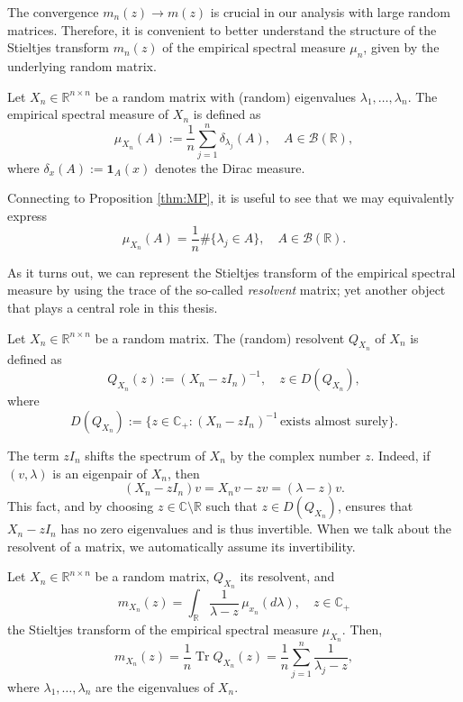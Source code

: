 \documentclass{article}
\begin{document}
\bigskip
\par
The convergence $m_n(z)\to m(z)$ is crucial in our analysis with large random matrices. Therefore, it is convenient to better understand the structure of the Stieltjes transform $m_n(z)$ of the empirical spectral measure $\mu_n$, given by the underlying random matrix.
\bigskip
\\
\begin{definition}
Let $X_n\in\mathbb{R}^{n\times n}$ be a random matrix with (random) eigenvalues $\lambda_1,\dots,\lambda_n$. The empirical spectral measure of $X_n$ is defined as
$$\mu_{X_n}(A):=\frac{1}{n}\sum_{j=1}^n\delta_{\lambda_j}(A),\quad A\in\mathcal{B}(\mathbb{R}),$$
where $\delta_x(A):=\mathbf{1}_A(x)$ denotes the Dirac measure.
\end{definition}
\bigskip
\par
Connecting to Proposition \ref{thm:MP}, it is useful to see that we may equivalently express
\begin{equation}
\mu_{X_n}(A)=\frac{1}{n}\#\{\lambda_j\in A\},\quad A\in\mathcal{B}(\mathbb{R}).
\end{equation}
\smallskip
\par
As it turns out, we can represent the Stieltjes transform of the empirical spectral measure by using the trace of the so-called \emph{resolvent} matrix; yet another object that plays a central role in this thesis.
\bigskip
\\
\begin{definition}[Resolvent]
Let $X_n\in\mathbb{R}^{n\times n}$ be a random matrix. The (random) resolvent $Q_{X_n}$ of $X_n$ is defined as
$$Q_{X_n}(z):=(X_n-zI_n)^{-1},\quad z\in D(Q_{X_n}),$$
where
$$D(Q_{X_n}):=\{z\in\mathbb{C}_+:(X_n-zI_n)^{-1}\,\text{exists almost surely}\}.$$
\end{definition}
\smallskip
\par
The term $zI_n$ shifts the spectrum of $X_n$ by the complex number $z$. Indeed, if $(v,\lambda)$ is an eigenpair of $X_n$, then
\begin{equation}
(X_n-zI_n)v=X_nv-zv=(\lambda-z)v.
\end{equation}
This fact, and by choosing $z\in\mathbb{C}\setminus\mathbb{R}$ such that $z\in D(Q_{X_n})$, ensures that $X_n-zI_n$ has no zero eigenvalues and is thus invertible. When we talk about the resolvent of a matrix, we automatically assume its invertibility.
\bigskip
\\
\begin{lemma}\label{thm:stieltjes-trace-lemma}
Let $X_n\in\mathbb{R}^{n\times n}$ be a random matrix, $Q_{X_n}$ its resolvent, and
$$m_{X_n}(z)=\int_{\mathbb{R}}\frac{1}{\lambda-z}\,\mu_{x_n}(d\lambda),\quad z\in\mathbb{C}_+$$
the Stieltjes transform of the empirical spectral measure $\mu_{X_n}$.
Then,
$$m_{X_n}(z)=\frac{1}{n}\operatorname{Tr}Q_{X_n}(z)=\frac{1}{n}\sum_{j=1}^n\frac{1}{\lambda_j-z},$$
where $\lambda_1,\dots,\lambda_n$ are the eigenvalues of $X_n$.
\end{lemma}
\end{document}
